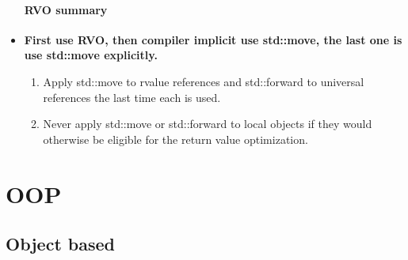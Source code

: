 \documentclass[a4paper,11pt,twoside]{book}
\begin{document}
\begin{itemize}
\subsubsection{RVO summary}

\item \textbf{First use RVO, then compiler implicit use std::move, the last one is use std::move explicitly.}

\begin{enumerate}
\item Apply std::move to rvalue references and std::forward to universal references
the last time each is used.

\item Never apply std::move or std::forward to local objects if they would otherwise
be eligible for the return value optimization.
\end{enumerate}


\end{itemize}


\chapter{OOP}
\section{Object based}
\end{document}
